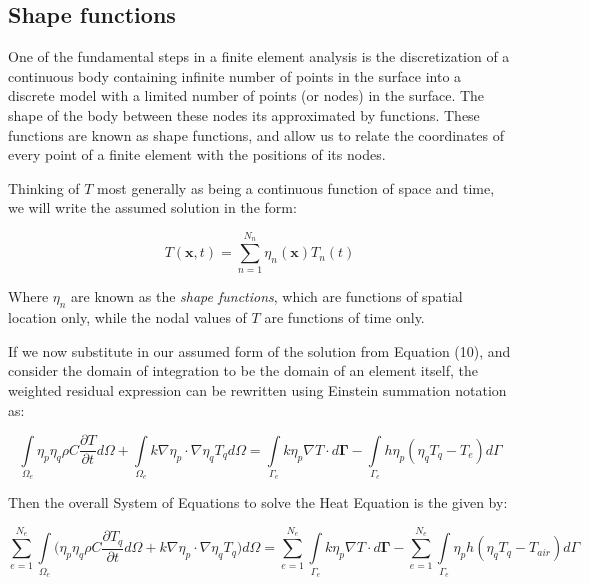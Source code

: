 \documentclass[12pt]{article}
\begin{document}
	\subsection{Shape functions}

One of the fundamental steps in a finite element analysis is the discretization of a continuous body containing infinite number of points in the surface into a discrete model with a limited number of points (or nodes) in the surface. The shape of the body between these nodes its approximated by functions. These functions are known as shape functions, and allow us to relate the coordinates of every point of a finite element with the positions of its nodes.

Thinking of $T$ most generally as being a continuous function of space and time, we will write the assumed solution in the form:

\begin{equation}
T(\mathbf{x},t) = \sum_{n=1}^{N_n} \eta_n(\mathbf{x})T_n(t)
\end{equation}

Where $\eta_n$ are known as the \textsl{shape functions}, which are functions of spatial location only, while the nodal values of $T$ are functions of time only. 

If we now substitute in our assumed form of the solution from Equation (10), and consider the domain of integration to be the domain of an element itself, the weighted residual expression can be rewritten using Einstein summation notation as:

	\begin{equation}
	\int\limits_{\Omega_e} \eta_p\eta_q \rho C \frac{\partial T}{\partial t} d\Omega + \int\limits_{\Omega_e} k \nabla \eta_p \cdot \nabla \eta_q T_q d\Omega = \int\limits_{\Gamma_{e}}{k\eta_p\nabla T} \cdot d \mathbf{\Gamma} - \int\limits_{\Gamma_{e}}h\eta_p(\eta_qT_q-T_{e}) d\Gamma
	\end{equation}

Then the overall System of Equations to solve the Heat Equation is the given by:

\begin{equation}
	\sum_{e=1}^{N_e}  \int\limits_{\Omega_e} \bigg(\eta_p\eta_q \rho C \frac{\partial T_q}{\partial t} d\Omega + k \nabla \eta_p \cdot \nabla \eta_q T_q\bigg) d\Omega = \sum_{e=1}^{N_e} \int\limits_{\Gamma_{e}}{k\eta_p\nabla T} \cdot d \mathbf{\Gamma} - \sum_{e=1}^{N_e} \int\limits_{\Gamma_{e}}\eta_p h (\eta_qT_q-T_{air}) d\Gamma
	\end{equation}
\end{document}
